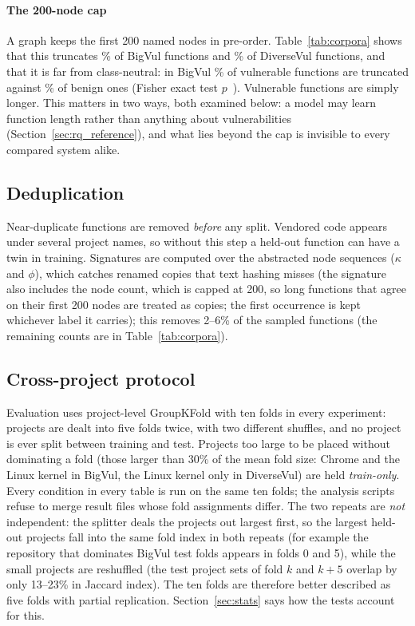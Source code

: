 \paragraph{The 200-node cap} A graph keeps the first 200 named nodes in
pre-order. Table~\ref{tab:corpora} shows that this truncates
\numbigvulTruncPct\% of BigVul functions and \numdiversevulTruncPct\% of
DiverseVul functions, and that it is far from class-neutral: in BigVul
\numbigvulTruncVulnPct\% of vulnerable functions are truncated against
\numbigvulTruncBenignPct\% of benign ones (Fisher exact test
$p$~\numbigvulTruncP). Vulnerable functions are simply longer. This matters in
two ways, both examined below: a model may learn function length rather than
anything about vulnerabilities (Section~\ref{sec:rq_reference}), and what lies
beyond the cap is invisible to every compared system alike.

\subsection{Deduplication}
\label{sec:dedup}
Near-duplicate functions are removed \emph{before} any split. Vendored code
appears under several project names, so without this step a held-out function
can have a twin in training. Signatures are computed over the abstracted node
sequences ($\kappa$ and $\phi$), which catches renamed copies that text hashing
misses (the signature also includes the node count, which is capped at 200,
so long functions that agree on their first 200 nodes are treated as copies;
the first occurrence is kept whichever label it carries); this removes 2--6\% of the sampled functions (the remaining counts are
in Table~\ref{tab:corpora}).

\subsection{Cross-project protocol}
\label{sec:protocol}
Evaluation uses project-level GroupKFold with ten folds in every experiment:
projects are dealt into five folds twice, with two different shuffles, and no
project is ever split between training and test. Projects too large to be placed
without dominating a fold (those larger than 30\% of the mean fold size: Chrome and the Linux kernel in
BigVul, the Linux kernel only in DiverseVul) are held \emph{train-only}. Every
condition in every table is run on the same ten folds; the analysis scripts
refuse to merge result files whose fold assignments differ. The two repeats are
\emph{not} independent: the splitter deals the projects out largest first, so
the largest held-out projects fall into the same fold index in both repeats
(for example the repository that dominates BigVul test folds appears in folds 0
and 5), while the small projects are reshuffled (the test project sets of fold
$k$ and $k+5$ overlap by only 13--23\% in Jaccard index). The ten folds are
therefore better described as five folds with partial replication.
Section~\ref{sec:stats} says how the tests account for this.

